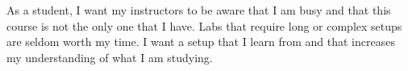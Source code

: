 As a student, I want my instructors to be aware that I am busy and that this course is not the only one that I have.  Labs that require long or complex setups are 
seldom worth my time.  I want a setup that I learn from and that increases my understanding of what I am studying.  
\bigskip